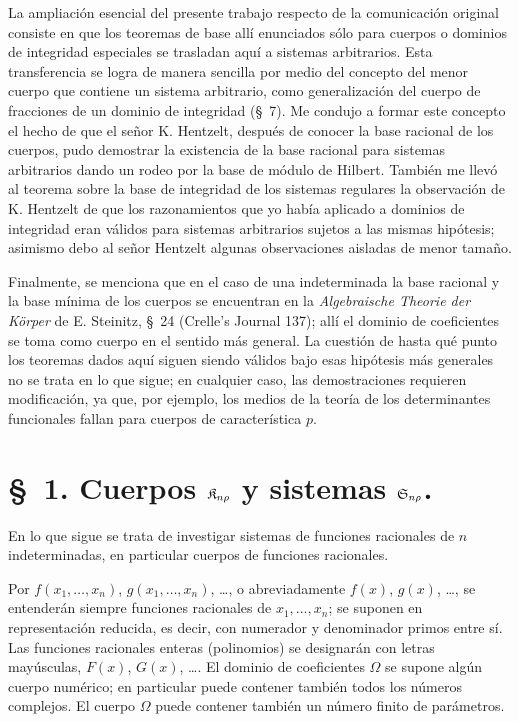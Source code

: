 \documentclass[11pt]{article}
\begin{document}
La ampliación esencial del presente trabajo respecto de la comunicación original consiste en que los teoremas de base allí enunciados sólo para cuerpos o dominios de integridad especiales se trasladan aquí a sistemas arbitrarios. Esta transferencia se logra de manera sencilla por medio del concepto del menor cuerpo que contiene un sistema arbitrario, como generalización del cuerpo de fracciones de un dominio de integridad (\S\ 7). Me condujo a formar este concepto el hecho de que el señor K. Hentzelt, después de conocer la base racional de los cuerpos, pudo demostrar la existencia de la base racional para sistemas arbitrarios dando un rodeo por la base de módulo de Hilbert. También me llevó al teorema sobre la base de integridad de los sistemas regulares la observación de K. Hentzelt de que los razonamientos que yo había aplicado a dominios de integridad eran válidos para sistemas arbitrarios sujetos a las mismas hipótesis; asimismo debo al señor Hentzelt algunas observaciones aisladas de menor tamaño.

Finalmente, se menciona que en el caso de una indeterminada la base racional y la base mínima de los cuerpos se encuentran en la \emph{Algebraische Theorie der Körper} de E. Steinitz, \S\ 24 (Crelle's Journal 137); allí el dominio de coeficientes se toma como cuerpo en el sentido más general. La cuestión de hasta qué punto los teoremas dados aquí siguen siendo válidos bajo esas hipótesis más generales no se trata en lo que sigue; en cualquier caso, las demostraciones requieren modificación, ya que, por ejemplo, los medios de la teoría de los determinantes funcionales fallan para cuerpos de característica $p$.

\section*{\S\ 1. Cuerpos $\mathfrak{K}_{n\rho}$ y sistemas $\mathfrak{S}_{n\rho}$.}

En lo que sigue se trata de investigar sistemas de funciones racionales de $n$ indeterminadas, en particular cuerpos de funciones racionales.

Por $f(x_1,\ldots,x_n)$, $g(x_1,\ldots,x_n)$, \ldots, o abreviadamente $f(x)$, $g(x)$, \ldots, se entenderán siempre funciones racionales de $x_1,\ldots,x_n$; se suponen en representación reducida, es decir, con numerador y denominador primos entre sí. Las funciones racionales enteras (polinomios) se designarán con letras mayúsculas, $F(x)$, $G(x)$, \ldots. El dominio de coeficientes $\Omega$ se supone algún cuerpo numérico; en particular puede contener también todos los números complejos. El cuerpo $\Omega$ puede contener también un número finito de parámetros.
\end{document}
